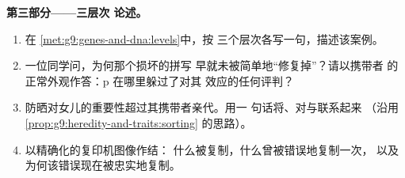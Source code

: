 \begin{problem}
\medskip\noindent\textbf{第三部分——三层次
论述。}
\begin{enumerate}[resume]
  \item 在
        \cref{met:g9:genes-and-dna:levels}中，按
        三个层次各写一句，描述该案例。
  \item 一位同学问，为何那个损坏的拼写
        早就未被简单地“修复掉”？请以携带者
        的正常外观作答：p 在哪里躲过了对其
        效应的任何评判？
  \item 防晒对女儿的重要性超过其携带者亲代。用一
        句话将、对与联系起来
        （沿用
        \cref{prop:g9:heredity-and-traits:sorting}
        的思路）。
  \item 以精确化的复印机图像作结：
        什么被复制，什么曾被错误地复制一次，
        以及为何该错误现在被忠实地复制。
\end{enumerate}
\end{problem}
